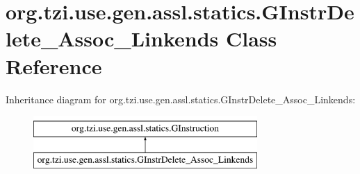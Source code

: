 \hypertarget{classorg_1_1tzi_1_1use_1_1gen_1_1assl_1_1statics_1_1_g_instr_delete___assoc___linkends}{\section{org.\-tzi.\-use.\-gen.\-assl.\-statics.\-G\-Instr\-Delete\-\_\-\-Assoc\-\_\-\-Linkends Class Reference}
\label{classorg_1_1tzi_1_1use_1_1gen_1_1assl_1_1statics_1_1_g_instr_delete___assoc___linkends}
}
Inheritance diagram for org.\-tzi.\-use.\-gen.\-assl.\-statics.\-G\-Instr\-Delete\-\_\-\-Assoc\-\_\-\-Linkends\-:\begin{figure}[H]
\begin{center}
\leavevmode
\includegraphics[height=2.000000cm]{classorg_1_1tzi_1_1use_1_1gen_1_1assl_1_1statics_1_1_g_instr_delete___assoc___linkends}
\end{center}
\end{figure}
